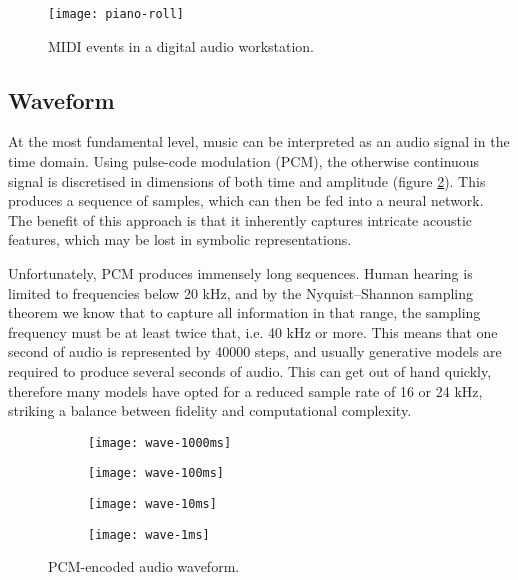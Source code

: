 \documentclass[../../report.tex]{subfiles}
\begin{document}
\begin{figure}
  \centering
  \texttt{[image: piano-roll]}
  \caption{MIDI events in a digital audio workstation.}
  \label{fig:piano-roll}
\end{figure}

\subsection{Waveform}

At the most fundamental level, music can be interpreted as an audio signal in
the time domain. Using pulse-code modulation (PCM), the otherwise continuous
signal is discretised in dimensions of both time and amplitude (figure
\ref{fig:pcm}). This produces a sequence of samples, which can then be fed into
a neural network. The benefit of this approach is that it inherently captures
intricate acoustic features, which may be lost in symbolic representations.
\cite{Dieleman2020}

Unfortunately, PCM produces immensely long sequences. Human hearing is limited
to frequencies below 20 kHz, and by the Nyquist--Shannon sampling theorem we
know that to capture all information in that range, the sampling frequency must
be at least twice that, i.e. 40 kHz or more. This means that one second of audio
is represented by \num{40000} steps, and usually generative models are required
to produce several seconds of audio. This can get out of hand quickly, therefore
many models have opted for a reduced sample rate of 16 or 24 kHz, striking a
balance between fidelity and computational complexity. \cite{Dieleman2020}

\begin{figure}
  \centering
  \begin{subfigure}[b]{0.24\textwidth}
    \texttt{[image: wave-1000ms]}
  \end{subfigure}
  \hfill
  \begin{subfigure}[b]{0.24\textwidth}
    \texttt{[image: wave-100ms]}
  \end{subfigure}
  \hfill
  \begin{subfigure}[b]{0.24\textwidth}
    \texttt{[image: wave-10ms]}
  \end{subfigure}
  \hfill
  \begin{subfigure}[b]{0.24\textwidth}
    \texttt{[image: wave-1ms]}
  \end{subfigure}
  \caption{PCM-encoded audio waveform. \cite{Oord2016}}
  \label{fig:pcm}
\end{figure}
\end{document}
